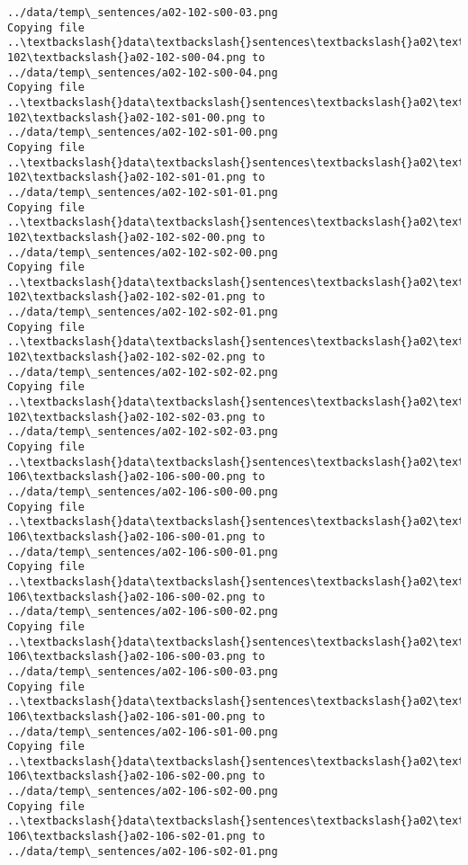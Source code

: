\documentclass[11pt]{article}
\begin{document}
\begin{Verbatim}[commandchars=\\\{\}]
../data/temp\_sentences/a02-102-s00-03.png
Copying file ..\textbackslash{}data\textbackslash{}sentences\textbackslash{}a02\textbackslash{}a02-102\textbackslash{}a02-102-s00-04.png to
../data/temp\_sentences/a02-102-s00-04.png
Copying file ..\textbackslash{}data\textbackslash{}sentences\textbackslash{}a02\textbackslash{}a02-102\textbackslash{}a02-102-s01-00.png to
../data/temp\_sentences/a02-102-s01-00.png
Copying file ..\textbackslash{}data\textbackslash{}sentences\textbackslash{}a02\textbackslash{}a02-102\textbackslash{}a02-102-s01-01.png to
../data/temp\_sentences/a02-102-s01-01.png
Copying file ..\textbackslash{}data\textbackslash{}sentences\textbackslash{}a02\textbackslash{}a02-102\textbackslash{}a02-102-s02-00.png to
../data/temp\_sentences/a02-102-s02-00.png
Copying file ..\textbackslash{}data\textbackslash{}sentences\textbackslash{}a02\textbackslash{}a02-102\textbackslash{}a02-102-s02-01.png to
../data/temp\_sentences/a02-102-s02-01.png
Copying file ..\textbackslash{}data\textbackslash{}sentences\textbackslash{}a02\textbackslash{}a02-102\textbackslash{}a02-102-s02-02.png to
../data/temp\_sentences/a02-102-s02-02.png
Copying file ..\textbackslash{}data\textbackslash{}sentences\textbackslash{}a02\textbackslash{}a02-102\textbackslash{}a02-102-s02-03.png to
../data/temp\_sentences/a02-102-s02-03.png
Copying file ..\textbackslash{}data\textbackslash{}sentences\textbackslash{}a02\textbackslash{}a02-106\textbackslash{}a02-106-s00-00.png to
../data/temp\_sentences/a02-106-s00-00.png
Copying file ..\textbackslash{}data\textbackslash{}sentences\textbackslash{}a02\textbackslash{}a02-106\textbackslash{}a02-106-s00-01.png to
../data/temp\_sentences/a02-106-s00-01.png
Copying file ..\textbackslash{}data\textbackslash{}sentences\textbackslash{}a02\textbackslash{}a02-106\textbackslash{}a02-106-s00-02.png to
../data/temp\_sentences/a02-106-s00-02.png
Copying file ..\textbackslash{}data\textbackslash{}sentences\textbackslash{}a02\textbackslash{}a02-106\textbackslash{}a02-106-s00-03.png to
../data/temp\_sentences/a02-106-s00-03.png
Copying file ..\textbackslash{}data\textbackslash{}sentences\textbackslash{}a02\textbackslash{}a02-106\textbackslash{}a02-106-s01-00.png to
../data/temp\_sentences/a02-106-s01-00.png
Copying file ..\textbackslash{}data\textbackslash{}sentences\textbackslash{}a02\textbackslash{}a02-106\textbackslash{}a02-106-s02-00.png to
../data/temp\_sentences/a02-106-s02-00.png
Copying file ..\textbackslash{}data\textbackslash{}sentences\textbackslash{}a02\textbackslash{}a02-106\textbackslash{}a02-106-s02-01.png to
../data/temp\_sentences/a02-106-s02-01.png

\end{Verbatim}
\end{document}
